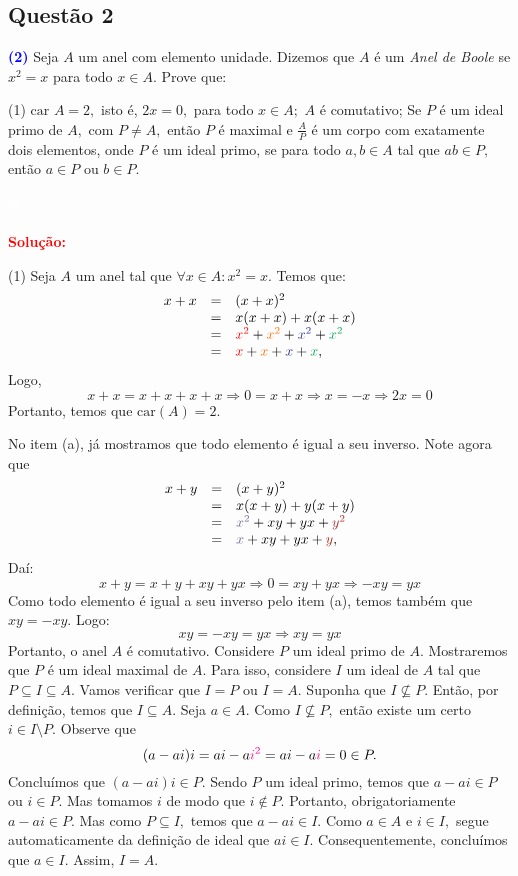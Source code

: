 \documentclass[11pt,a4paper]{article}
\newcommand{\questao}[1]{\subsection{Questão #1} \textcolor{blue}{\bf(#1)}}
\newcommand{\dividiritens}[1]{\begin{tasks}[counter-format={(tsk[a])},label-width=3.6ex, label-format = {\bfseries}, column-sep = {0pt}](1) #1 \end{tasks}}
\newcommand{\pers}[1]{\textcolor{Floresta}{$\negrito{(#1)} $}}
\newcommand{\solucao}[1]{
\textbf{\textcolor{white}{oi}\\ \\ \textcolor{red}{Solução:}} #1}
\begin{document}
\questao{2} Seja $A$ um anel com elemento unidade. Dizemos que $A$ é um \emph{Anel de Boole} se $x^2 = x$ para todo $x \in A.$ Prove que:
\dividiritens{
\task[\pers{a}] $\mbox{car } A = 2,$ isto é, $2x = 0,$ para todo $x \in A;$
\task[\pers{b}] $A$ é comutativo;
\task[\pers{c}] Se $P$ é um ideal primo de $A,$ com $P \neq A,$ então $P$ é maximal e $\frac{A}{P}$ é um corpo com exatamente dois elementos, onde $P$ é um ideal primo, se para todo $a,b \in A$ tal que $ab \in P,$ então $a \in P$ ou $b \in P.$
}

\solucao{\dividiritens{
\task[\pers{a}] 
Seja $A$ um anel tal que $\forall x\in A:x^2=x$. Temos que: 
\[
\begin{array}{rcl}
x+x&=&(x+x)^2\\&=&x(x+x)+x(x+x)\\&=&\textcolor{red}{x^2}+\textcolor{Laranja}{x^2}+\textcolor{Blue}{x^2}+\textcolor{Green}{x^2}\\&=&\textcolor{red}{x}+\textcolor{Laranja}{x}+\textcolor{Blue}{x}+\textcolor{Green}{x},
\end{array}
\]
Logo,
\[
x + x = x + x +x + x \Rightarrow 0=x+x \Rightarrow x = -x \Rightarrow \boxed{2x = 0}
\]
Portanto, temos que $\mbox{car}(A) = 2.$

\task[\pers{b}] No item (a), já mostramos que todo elemento é igual a seu inverso. Note agora que
\[
\begin{array}{rcl}
x+y&=&(x+y)^2\\&=&x(x+y)+y(x+y)\\&=&\textcolor{CadetBlue}{x^2}+xy+yx+\textcolor{Mahogany}{y^2}\\&=&\textcolor{CadetBlue}{x}+xy+yx+\textcolor{Mahogany}{y},
\end{array}
\]
Daí:
\[
x + y = x + y + xy + yx \Rightarrow 0=xy+yx \Rightarrow -xy = yx
\]
Como todo elemento é igual a seu inverso pelo item (a), temos também que $xy = -xy.$ Logo:
\[
xy = -xy = yx \Rightarrow \boxed{xy = yx}
\]
Portanto, o anel $A$ é comutativo.
\task[\pers{c}] Considere $P$ um ideal primo de $A$. Mostraremos que $P$ é um ideal maximal de $A.$ Para isso, considere $I$ um ideal de $A$ tal que $P \subseteq I \subseteq A.$ Vamos verificar que $I = P$ ou $I = A.$ Suponha que $I \nsubseteq P.$ Então, por definição, temos que $I \subseteq A.$ Seja $a \in A.$ Como $I \nsubseteq P,$ então existe um certo $i \in I \setminus P.$ Observe que
\[
(a - ai) i = a i - a \textcolor{Magenta}{i^2} = ai -  a \textcolor{Magenta}{i} = 0 \in P.
\]
Concluímos que $(a - ai) i \in P.$ Sendo $P$ um ideal primo, temos que $a - ai \in P$ ou $i \in P.$ Mas tomamos $i$ de modo que $i \notin P.$ Portanto, obrigatoriamente $a - ai \in P.$ Mas como $P \subseteq I,$ temos que $a - ai \in I.$ Como $a \in A$ e $i \in I,$ segue automaticamente da definição de ideal que $ai \in I.$ Consequentemente, concluímos que $a \in I.$ Assim, $I = A.$

}}
\end{document}
